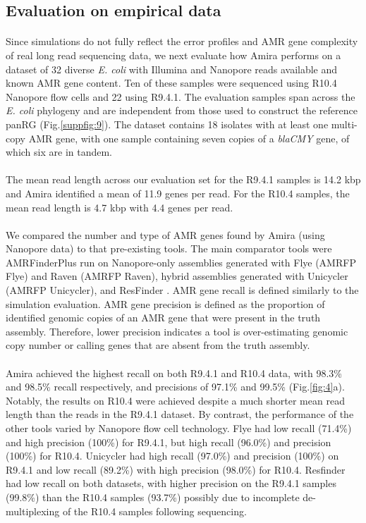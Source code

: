 \subsection*{Evaluation on empirical data}
\paragraph{}
Since simulations do not fully reflect the error profiles and AMR gene complexity of real long read sequencing data, we next evaluate how Amira performs on a dataset of 32 diverse \textit{E. coli} with Illumina and Nanopore reads available and known AMR gene content. Ten of these samples were sequenced using R10.4 Nanopore flow cells and 22 using R9.4.1. The evaluation samples span across the \textit{E. coli} phylogeny and are independent from those used to construct the reference panRG (Fig.\ref{suppfig:9}). The dataset contains 18 isolates with at least one multi-copy AMR gene, with one sample containing seven copies of a \textit{blaCMY} gene, of which six are in tandem. 
\paragraph{}
The mean read length across our evaluation set for the R9.4.1 samples is 14.2 kbp and Amira identified a mean of 11.9 genes per read. For the R10.4 samples, the mean read length is 4.7 kbp with 4.4 genes per read.
\paragraph{}
We compared the number and type of AMR genes found by Amira (using Nanopore data) to that pre-existing tools. The main comparator tools were AMRFinderPlus run on Nanopore-only assemblies generated with Flye \cite{Kolmogorov2019} (AMRFP Flye) and Raven \cite{10.1038/s43588-021-00073-4} (AMRFP Raven), hybrid assemblies generated with Unicycler \cite{Wick2017} (AMRFP Unicycler), and ResFinder \cite{Bortolaia2020}. AMR gene recall is defined similarly to the simulation evaluation. AMR gene precision is defined as the proportion of identified genomic copies of an AMR gene that were present in the truth assembly. Therefore, lower precision indicates a tool is over-estimating genomic copy number or calling genes that are absent from the truth assembly.
\paragraph{}
Amira achieved the highest recall on both R9.4.1 and R10.4 data, with 98.3\% and 98.5\% recall respectively, and precisions of 97.1\% and 99.5\% (Fig.\ref{fig:4}a). Notably, the results on R10.4 were achieved despite a much shorter mean read length than the reads in the R9.4.1 dataset. By contrast, the performance of the other tools varied by Nanopore flow cell technology. Flye had low recall (71.4\%) and high precision (100\%) for R9.4.1, but high recall (96.0\%) and precision (100\%) for R10.4. Unicycler had high recall (97.0\%) and precision (100\%) on R9.4.1 and low recall (89.2\%) with high precision (98.0\%) for R10.4. Resfinder had low recall on both datasets, with higher precision on the R9.4.1 samples (99.8\%) than the R10.4 samples (93.7\%) possibly due to incomplete de-multiplexing of the R10.4 samples following sequencing.
